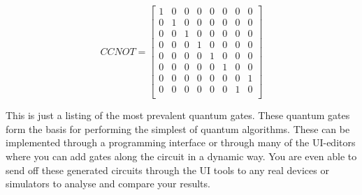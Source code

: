  \[
CCNOT=
\begin{bmatrix}
1 & 0 & 0 & 0 & 0 & 0 & 0 & 0\\
0 & 1 & 0 & 0 & 0 & 0 & 0 & 0\\
0 & 0 & 1 & 0 & 0 & 0 & 0 &  0\\
0 & 0 & 0 & 1 & 0 & 0 & 0  & 0\\
0 & 0 & 0 & 0 & 1 & 0 & 0  & 0\\
0 & 0 & 0 & 0 & 0 & 1 & 0  & 0\\
0 & 0 & 0 & 0 & 0 & 0 & 0 & 1 \\
0 & 0 & 0 & 0 & 0 & 0 & 1 & 0\\
\end{bmatrix}
\]

This is just a listing of the most prevalent quantum gates. These quantum gates form the basis for performing the simplest of quantum algorithms. These can be implemented through a programming interface or through many of the UI-editors where you can add gates along the circuit in a dynamic way. You are even able to send off these generated circuits through the UI tools to any real devices or simulators to analyse and compare your results.




